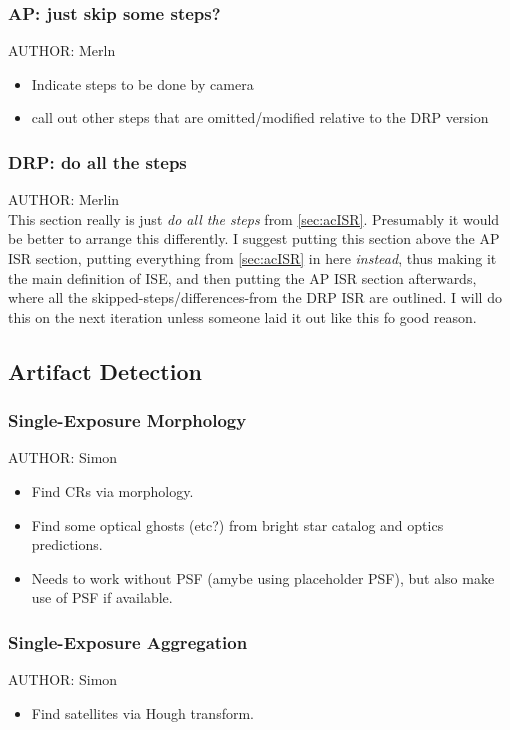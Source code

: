 \subsubsection{AP: just skip some steps?}
AUTHOR: Merln\\
\begin{itemize}
\item Indicate steps to be done by camera
\item call out other steps that are omitted/modified relative to the DRP version
\end{itemize}

\subsubsection{DRP: do all the steps}
AUTHOR: Merlin\\
This section really is just \emph{do all the steps} from \secsymbol\ref{sec:acISR}. Presumably it would be better to arrange this differently. I suggest putting this section above the AP ISR section, putting everything from \secsymbol\ref{sec:acISR} in here \emph{instead}, thus making it the main definition of ISE, and then putting the AP ISR section afterwards, where all the skipped-steps/differences-from the DRP ISR are outlined. I will do this on the next iteration unless someone laid it out like this fo good reason.


\subsection{Artifact Detection}
\label{sec:artifact}

\subsubsection{Single-Exposure Morphology}
\label{sec:acMorphologicalArtifactDetection}
AUTHOR: Simon
\begin{itemize}
\item Find CRs via morphology.
\item Find some optical ghosts (etc?) from bright star catalog and optics predictions.
\item Needs to work without PSF (amybe using placeholder PSF), but also make use of PSF if available.
\end{itemize}

\subsubsection{Single-Exposure Aggregation}
AUTHOR: Simon
\begin{itemize}
\item Find satellites via Hough transform.
\end{itemize}

